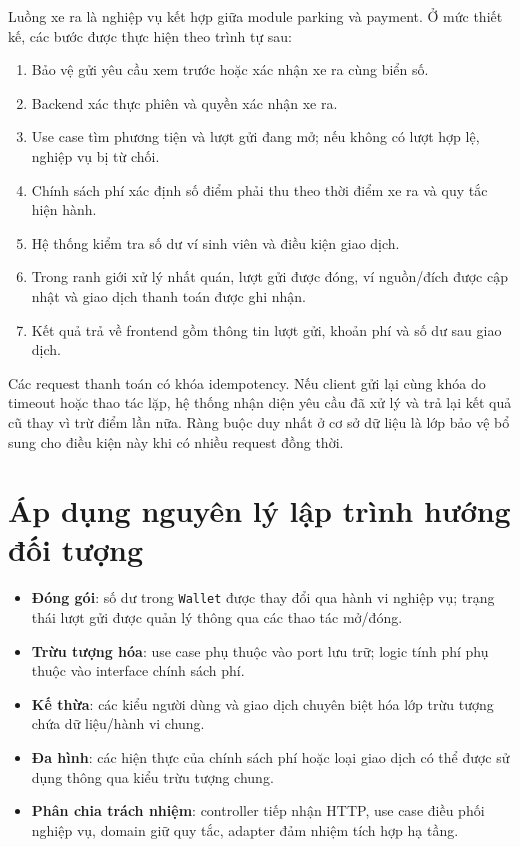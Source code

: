 Luồng xe ra là nghiệp vụ kết hợp giữa module parking và payment. Ở mức thiết kế, các bước được thực hiện theo trình tự sau:
\begin{enumerate}[label=\arabic*)]
    \item Bảo vệ gửi yêu cầu xem trước hoặc xác nhận xe ra cùng biển số.
    \item Backend xác thực phiên và quyền xác nhận xe ra.
    \item Use case tìm phương tiện và lượt gửi đang mở; nếu không có lượt hợp lệ, nghiệp vụ bị từ chối.
    \item Chính sách phí xác định số điểm phải thu theo thời điểm xe ra và quy tắc hiện hành.
    \item Hệ thống kiểm tra số dư ví sinh viên và điều kiện giao dịch.
    \item Trong ranh giới xử lý nhất quán, lượt gửi được đóng, ví nguồn/đích được cập nhật và giao dịch thanh toán được ghi nhận.
    \item Kết quả trả về frontend gồm thông tin lượt gửi, khoản phí và số dư sau giao dịch.
\end{enumerate}

Các request thanh toán có khóa idempotency. Nếu client gửi lại cùng khóa do timeout hoặc thao tác lặp, hệ thống nhận diện yêu cầu đã xử lý và trả lại kết quả cũ thay vì trừ điểm lần nữa. Ràng buộc duy nhất ở cơ sở dữ liệu là lớp bảo vệ bổ sung cho điều kiện này khi có nhiều request đồng thời.

\section{Áp dụng nguyên lý lập trình hướng đối tượng}

\begin{itemize}
    \item \textbf{Đóng gói}: số dư trong \texttt{Wallet} được thay đổi qua hành vi nghiệp vụ; trạng thái lượt gửi được quản lý thông qua các thao tác mở/đóng.
    \item \textbf{Trừu tượng hóa}: use case phụ thuộc vào port lưu trữ; logic tính phí phụ thuộc vào interface chính sách phí.
    \item \textbf{Kế thừa}: các kiểu người dùng và giao dịch chuyên biệt hóa lớp trừu tượng chứa dữ liệu/hành vi chung.
    \item \textbf{Đa hình}: các hiện thực của chính sách phí hoặc loại giao dịch có thể được sử dụng thông qua kiểu trừu tượng chung.
    \item \textbf{Phân chia trách nhiệm}: controller tiếp nhận HTTP, use case điều phối nghiệp vụ, domain giữ quy tắc, adapter đảm nhiệm tích hợp hạ tầng.
\end{itemize}

